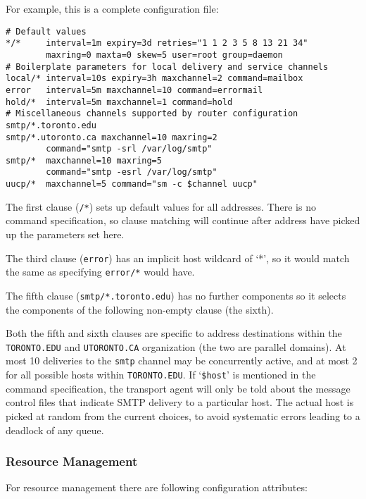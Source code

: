 For example, this is a complete configuration file:
\begin{tscreen}
\begin{verbatim}
# Default values
*/*     interval=1m expiry=3d retries="1 1 2 3 5 8 13 21 34"
        maxring=0 maxta=0 skew=5 user=root group=daemon
# Boilerplate parameters for local delivery and service channels
local/* interval=10s expiry=3h maxchannel=2 command=mailbox
error   interval=5m maxchannel=10 command=errormail
hold/*  interval=5m maxchannel=1 command=hold
# Miscellaneous channels supported by router configuration
smtp/*.toronto.edu
smtp/*.utoronto.ca maxchannel=10 maxring=2
        command="smtp -srl /var/log/smtp"
smtp/*  maxchannel=10 maxring=5
        command="smtp -esrl /var/log/smtp"
uucp/*  maxchannel=5 command="sm -c $channel uucp"
\end{verbatim}
\end{tscreen}

The first clause ({\tt */*}) sets up default values for all
addresses. There is no command specification, so clause matching
will continue after address have picked up the parameters set here. 

The third clause ({\tt error}) has an implicit host wildcard of `*', 
so it would match the same as specifying {\tt error/*} would have.

The fifth clause ({\tt smtp/*.toronto.edu}) has no further components 
so it selects the components of the following non-empty clause (the sixth).

Both the fifth and sixth clauses are specific to address destinations
within the {\tt TORONTO.EDU} and {\tt UTORONTO.CA} organization (the 
two are parallel domains). At most 10 deliveries to the {\tt smtp} channel
may be concurrently active, and at most 2 for all possible hosts within
{\tt TORONTO.EDU}. If `{\tt \$host}' is mentioned in the command 
specification, the transport agent will only be told about the message 
control files that indicate SMTP delivery to a particular host. The actual 
host is picked at random from the current choices, to avoid systematic
errors leading to a deadlock of any queue. 






\subsubsection{Resource Management}



For resource management there are following configuration attributes: 

